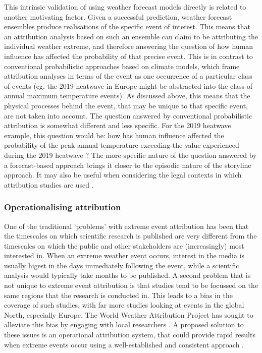     This intrinsic validation of using weather forecast models directly is related to another motivating factor. Given a successful prediction, weather forecast ensembles produce realisations of the specific event of interest. This means that an attribution analysis based on such an ensemble can claim to be attributing the individual weather extreme, and therefore answering the question of how human influence has affected the probability of that precise event. This is in contrast to conventional probabilistic approaches based on climate models, which frame attribution analyses in terms of the event as one occurrence of a particular class of events (eg. the 2019 heatwave in Europe might be abstracted into the class of annual maximum temperature events). As discussed above, this means that the physical processes behind the event, that may be unique to that specific event, are not taken into account. The question answered by conventional probabilistic attribution is somewhat different and less specific. For the 2019 heatwave example, this question would be: how has human influence affected the probability of the peak annual temperature exceeding the value experienced during the 2019 heatwave \citep{vautard_human_2020}? The more specific nature of the question answered by a forecast-based approach brings it closer to the episodic nature of the storyline approach. It may also be useful when considering the legal contexts in which attribution studies are used \citep{lloyd_climate_2021-1}.

    \subsubsection{Operationalising attribution}

      One of the traditional `problems' with extreme event attribution has been that the timescales on which scientific research is published are very different from the timescales on which the public and other stakeholders are (increasingly) most interested in. When an extreme weather event occurs, interest in the media is usually higest in the days immediately following the event, while a scientific analysis would typically take months to be published. A second problem that is not unique to extreme event attribution is that studies tend to be focussed on the same regions that the research is conducted in. This leads to a bias in the coverage of such studies, with far more studies looking at events in the global North, especially Europe. The World Weather Attribution Project has sought to alleviate this bias by engaging with local researchers \citep{van_oldenborgh_pathways_2021}. A proposed solution to these issues is an operational attribution system, that could provide rapid results when extreme events occur using a well-established and consistent approach \citep{national_academies_of_sciences_engineering_and_medicine_attribution_2016}.

